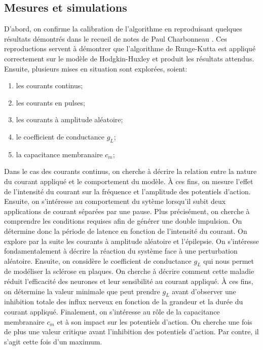 \documentclass{article}
\begin{document}
\subsection{Mesures et simulations}\label{subsec:mesures_simulations}

D'abord, on confirme la calibration de l'algorithme en reproduisant quelques résultats démontrés dans le recueil de notes de Paul Charbonneau \cite{notes_cours}. Ces reproductions servent à démontrer que l'algorithme de Runge-Kutta est appliqué correctement sur le modèle de Hodgkin-Huxley et produit les résultats attendus. Ensuite, plusieurs mises en situation sont explorées, soient: 

\begin{enumerate}
	\item les courants continus;
	\item les courants en pulses;
	\item les courants à amplitude aléatoire;
	\item le coefficient de conductance $g_L$;
	\item la capacitance membranaire $c_m$;
\end{enumerate}

Dans le cas des courants continus, on cherche à décrire la relation entre la nature du courant appliqué et le comportement du modèle. À ces fins, on mesure l'effet de l'intensité du courant sur la fréquence et l'amplitude des potentiels d'action.  Ensuite, on s'intéresse au comportement du sytème lorsqu'il subit deux applications de courant séparées par une pause. Plus précisément, on cherche à comprendre les conditions requises afin de générer une double impulsion. On détermine donc la période de latence en fonction de l'intensité du courant. On explore par la suite les courants à amplitude aléatoire et l'épilepsie. On s'intéresse fondamentalement à décrire la réaction du système face à une perturbation aléatoire. Ensuite, on considère le coefficient de conductance $g_L$ qui nous permet de modéliser la sclérose en plaques. On cherche à décrire comment cette maladie réduit l'efficacité des neurones et leur sensibilité au courant appliqué. À ces fins, on détermine la valeur minimale que peut prendre $g_L$ avant d'observer une inhibition totale des influx nerveux en fonction de la grandeur et la durée du courant appliqué. Finalement, on s'intéresse au rôle de la capacitance membranaire $c_m$ et à son impact sur les potentiels d'action. On cherche une fois de plus une valeur critique avant l'inhibition des potentiels d'action. Par contre, il s'agit cette fois d'un maximum.
\end{document}
